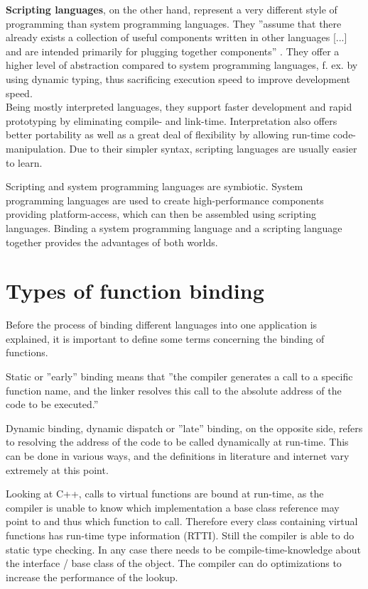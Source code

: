 \textbf{Scripting languages}, on the other hand, represent a very different style of programming than system programming languages. They ''assume that there already exists a collection of useful components written in other languages [...] and are intended primarily for plugging together components'' . They offer a higher level of abstraction compared to system programming languages, f. ex. by using dynamic typing, thus sacrificing execution speed to improve development speed.\\ Being mostly interpreted languages, they support faster development and rapid prototyping by eliminating compile- and link-time. Interpretation also offers better portability as well as a great deal of flexibility by allowing run-time code-manipulation. Due to their simpler syntax, scripting languages are usually easier to learn.

Scripting and system programming languages are symbiotic. System programming languages are used to create high-performance components providing platform-access, which can then be assembled using scripting languages. Binding a system programming language and a scripting language together provides the advantages of both worlds.


\section{Types of function binding}

Before the process of binding different languages into one application is explained, it is important to define some terms concerning the binding of functions.

Static or ''early'' binding means that ''the compiler generates a call to a specific function name, and the linker resolves this call to the absolute address of the code to be executed.'' 

Dynamic binding, dynamic dispatch or ''late'' binding, on the opposite side, refers to resolving the address of the code to be called dynamically at run-time. This can be done in various ways, and the definitions in literature and internet vary extremely at this point.

Looking at C++, calls to virtual functions are bound at run-time, as the compiler is unable to know which implementation a base class reference may point to and thus which function to call. Therefore every class containing virtual functions has run-time type information (RTTI). Still the compiler is able to do static type checking. In any case there needs to be compile-time-knowledge about the interface / base class of the object. The compiler can do optimizations to increase the performance of the lookup.


